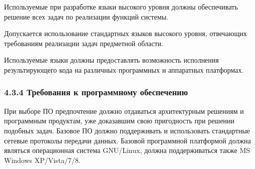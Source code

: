 Используемые при разработке языки высокого уровня должны обеспечивать решение
всех задач по реализации функций системы.

Допускается использование стандартных языков высокого уровня, отвечающих
требованиям реализации задач предметной области.

Используемые языки должны предоставлять возможность исполнения результирующего
кода на различных программных и аппаратных платформах.

\subsubsection*{4.3.4 Требования к программному обеспечению}

При выборе ПО предпочтение должно отдаваться архитектурным решениям и
программным продуктам, уже доказавшим свою пригодность при решении подобных
задач. Базовое ПО должно поддерживать и использовать стандартные сетевые
протоколы передачи данных. Базовой программной платформой должна являться
операционная система GNU/Linux, должна поддерживаться также MS Windows XP/Vista/7/8.
